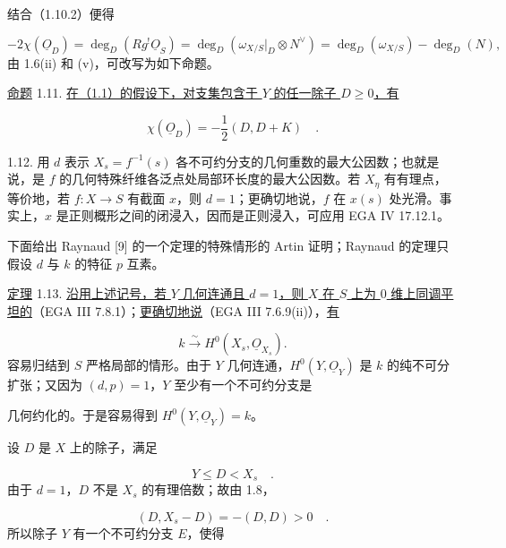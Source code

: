 
结合（1.10.2）便得

\begin{equation*}
-2\chi(\underline{O}_D)
=\deg_D(Rg^{!}\underline{O}_S)
=\deg_D(\omega_{X/S}|_D\otimes N^{\vee})
=\deg_D(\omega_{X/S})-\deg_D(N),
\end{equation*}
由 1.6(ii) 和 (v)，可改写为如下命题。

\underline{命题} 1.11. \underline{在（1.1）的假设下，对支集包含于 $Y$ 的任一除子 $D\geq0$，有}

\begin{equation*}
\chi(\underline{O}_D)=-\frac12(D,D+K) \quad .
\end{equation*}

1.12. 用 $d$ 表示 $X_s=f^{-1}(s)$ 各不可约分支的几何重数的最大公因数；也就是说，是 $f$ 的几何特殊纤维各泛点处局部环长度的最大公因数。若 $X_\eta$ 有有理点，等价地，若 $f:X\longrightarrow S$ 有截面 $x$，则 $d=1$；更确切地说，$f$ 在 $x(s)$ 处光滑。事实上，$x$ 是正则概形之间的闭浸入，因而是正则浸入，可应用 EGA IV 17.12.1。

下面给出 Raynaud [9] 的一个定理的特殊情形的 Artin 证明；Raynaud 的定理只假设 $d$ 与 $k$ 的特征 $p$ 互素。

\underline{定理} 1.13. \underline{沿用上述记号，若 $Y$ 几何连通且 $d=1$，则 $X$ 在 $S$ 上为 $0$ 维上同调平坦的}（EGA III 7.8.1）；\underline{更确切地说}（EGA III 7.6.9(ii)），\underline{有}

\begin{equation*}
k\xrightarrow{\;\sim\;}H^0(X_s,\underline{O}_{X_s}).
\end{equation*}
容易归结到 $S$ 严格局部的情形。由于 $Y$ 几何连通，$H^0(Y,\underline{O}_Y)$ 是 $k$ 的纯不可分扩张；又因为 $(d,p)=1$，$Y$ 至少有一个不可约分支是


几何约化的。于是容易得到 $H^0(Y,\underline{O}_Y)=k$。

设 $D$ 是 $X$ 上的除子，满足

\begin{equation*}
Y\leq D<X_s \quad .
\end{equation*}
由于 $d=1$，$D$ 不是 $X_s$ 的有理倍数；故由 1.8，

\begin{equation*}
(D,X_s-D)=-(D,D)>0 \quad .
\end{equation*}
所以除子 $Y$ 有一个不可约分支 $E$，使得

